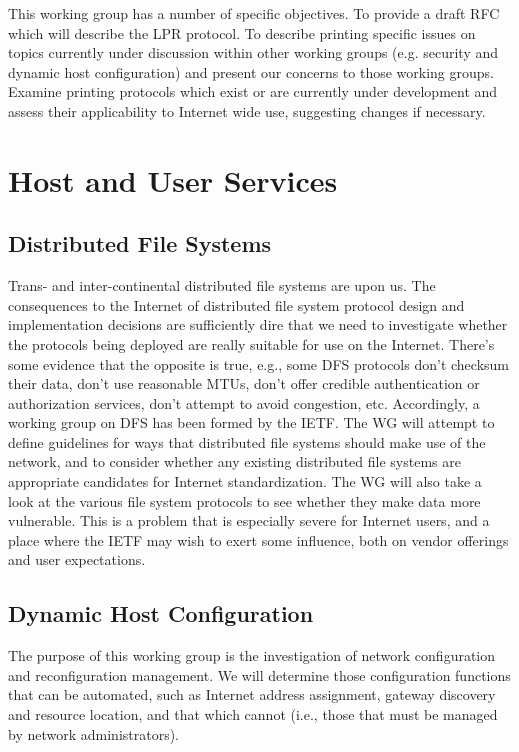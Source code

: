 This working group has a number of specific objectives.  To provide a
draft RFC which will describe the LPR protocol.  To describe printing
specific issues on topics currently under discussion within other
working groups (e.g. security and dynamic host configuration) and
present our concerns to those working groups.  Examine printing
protocols which exist or are currently under development and assess
their applicability to Internet wide use, suggesting changes if
necessary.

\newpage

\section{Host and User Services}

\subsection{Distributed File Systems}

Trans- and inter-continental distributed file systems are upon us.
The consequences to the Internet of distributed file system protocol
design and implementation decisions are sufficiently dire that we need
to investigate whether the protocols being deployed are really
suitable for use on the Internet.  There's some evidence that the
opposite is true, e.g., some DFS protocols don't checksum their data,
don't use reasonable MTUs, don't offer credible authentication or
authorization services, don't attempt to avoid congestion, etc.
Accordingly, a working group on DFS has been formed by the IETF. The
WG will attempt to define guidelines for ways that distributed file
systems should make use of the network, and to consider whether any
existing distributed file systems are appropriate candidates for
Internet standardization.  The WG will also take a look at the various
file system protocols to see whether they make data more vulnerable.
This is a problem that is especially severe for Internet users, and a
place where the IETF may wish to exert some influence, both on vendor
offerings and user expectations.


\subsection{Dynamic Host Configuration}

The purpose of this working group is the investigation of network
configuration and reconfiguration management.  We will determine those
configuration functions that can be automated, such as Internet
address assignment, gateway discovery and resource location, and that
which cannot (i.e., those that must be managed by network
administrators).


